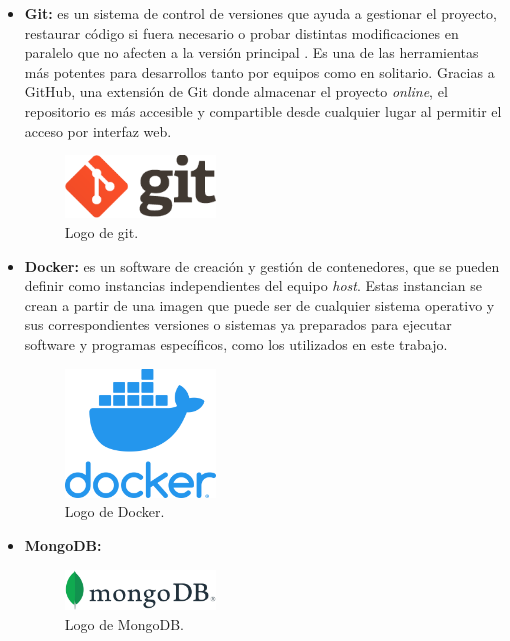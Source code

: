 \begin{itemize}
    \item \textbf{Git: }es un sistema de control de versiones que ayuda a gestionar el proyecto, restaurar código si fuera necesario o probar distintas modificaciones en paralelo que no afecten a la versión principal \cite{cap3_6}. Es una de las herramientas más potentes para desarrollos tanto por equipos como en solitario. Gracias a GitHub, una extensión de Git donde almacenar el proyecto \textit{online}, el repositorio es más accesible y compartible desde cualquier lugar al permitir el acceso por interfaz web.
    \begin{figure}[h]
        \centering
        \includegraphics[width=4cm]{imagenes/capitulo3/gitLogo.png}
        \caption{Logo de git.}
        \label{fig:git_logo}
    \end{figure}

    \item \textbf{Docker: }es un software de creación y gestión de contenedores, que se pueden definir como instancias independientes del equipo \textit{host}. Estas instancian se crean a partir de una imagen que puede ser de cualquier sistema operativo y sus correspondientes versiones o sistemas ya preparados para ejecutar software y programas específicos, como los utilizados en este trabajo.
    \begin{figure}[h]
        \centering
        \includegraphics[width=4cm]{imagenes/capitulo3/dockerLogo.png}
        \caption{Logo de Docker.}
        \label{fig:docker_logo}
    \end{figure}

    \item \textbf{MongoDB: }
    \begin{figure}[h]
        \centering
        \includegraphics[width=4cm]{imagenes/capitulo3/mongodbLogo.png}
        \caption{Logo de MongoDB.}
        \label{fig:mongodb_logo}
    \end{figure}
    
\end{itemize}

